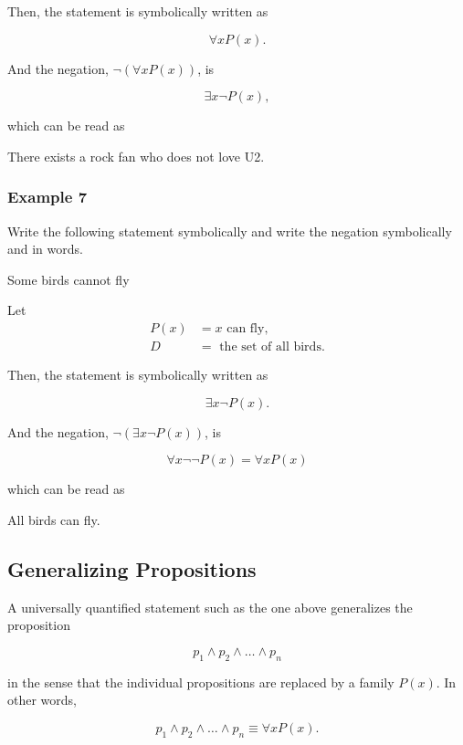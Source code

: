 Then, the statement is symbolically written as 

\[
    \forall x P(x).
\]

And the negation, $\lnot (\forall x P(x))$, is

\[
    \exists x \lnot P(x),
\]

which can be read as

\begin{center}
    There exists a rock fan who does not love U2.
\end{center}

\subsubsection{Example 7}

Write the following statement symbolically and write the negation symbolically and in words.
\begin{center}
    Some birds cannot fly
\end{center}

Let
\begin{align*}
    P(x) &= x \text{ can fly},\\
    D &= \text{ the set of all birds}.
\end{align*}

Then, the statement is symbolically written as 

\[
    \exists x \lnot P(x).
\]

And the negation, $\lnot (\exists x \lnot P(x))$, is

\[
    \forall x \lnot\lnot P(x) = \forall x P(x)
\]

which can be read as

\begin{center}
    All birds can fly.
\end{center}

\subsection*{Generalizing Propositions}

A universally quantified statement such as the one above generalizes the proposition

\[
    p_1 \land p_2 \land \dots \land p_n
\]

in the sense that the individual propositions are replaced by a family $P(x)$.  In other words,

\[
    p_1 \land p_2 \land \dots \land p_n \equiv \forall x P(x).
\]

